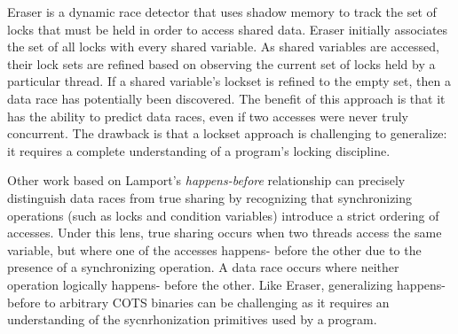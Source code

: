 \documentclass[letterpaper,twocolumn,10pt]{article}
\newcommand{\TextToolname}{Malcontent}
\newcommand{\Toolname}{\textsc{\TextToolname{}}}
\begin{document}
%

Eraser \cite{Eraser} is a dynamic race detector that uses shadow memory to track the set of locks that must be held in order
to access shared data. Eraser initially associates the set of all locks with every shared variable. As shared variables are accessed,
their lock sets are refined based on observing the current set of locks held by a particular thread. If a shared variable's lockset
is refined to the empty set, then a data race has potentially been discovered. The benefit of this approach is that it has the
ability to predict data races, even if two accesses were never truly concurrent. The drawback is that a lockset approach is
challenging to generalize: it requires a complete understanding of a program's locking discipline.

Other work based on Lamport's \emph{happens-before} relationship \cite{VectorClocks} can precisely distinguish data races
from true sharing by recognizing that synchronizing operations (such as locks and condition variables) introduce a strict ordering of
accesses. Under this lens, true sharing occurs when two threads access the same variable, but where one of the accesses happens-%
before the other due to the presence of a synchronizing operation. A data race occurs where neither operation logically happens-%
before the other. Like Eraser, generalizing happens-before to arbitrary COTS binaries can be challenging as it requires an
understanding of the sycnrhonization primitives used by a program.



%
\end{document}
